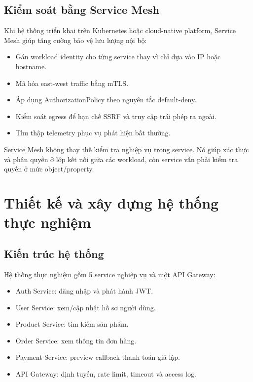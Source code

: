 \documentclass[14pt,a4paper]{extreport}
\begin{document}
\section{Kiểm soát bằng Service Mesh}
Khi hệ thống triển khai trên Kubernetes hoặc cloud-native platform, Service Mesh giúp tăng cường bảo vệ lưu lượng nội bộ:
\begin{itemize}
  \item Gán workload identity cho từng service thay vì chỉ dựa vào IP hoặc hostname.
  \item Mã hóa east-west traffic bằng mTLS.
  \item Áp dụng AuthorizationPolicy theo nguyên tắc default-deny.
  \item Kiểm soát egress để hạn chế SSRF và truy cập trái phép ra ngoài.
  \item Thu thập telemetry phục vụ phát hiện bất thường.
\end{itemize}

Service Mesh không thay thế kiểm tra nghiệp vụ trong service. Nó giúp xác thực và phân quyền ở lớp kết nối giữa các workload, còn service vẫn phải kiểm tra quyền ở mức object/property.

\chapter{Thiết kế và xây dựng hệ thống thực nghiệm}

\section{Kiến trúc hệ thống}
Hệ thống thực nghiệm gồm 5 service nghiệp vụ và một API Gateway:
\begin{itemize}
  \item Auth Service: đăng nhập và phát hành JWT.
  \item User Service: xem/cập nhật hồ sơ người dùng.
  \item Product Service: tìm kiếm sản phẩm.
  \item Order Service: xem thông tin đơn hàng.
  \item Payment Service: preview callback thanh toán giả lập.
  \item API Gateway: định tuyến, rate limit, timeout và access log.
\end{itemize}
\end{document}

